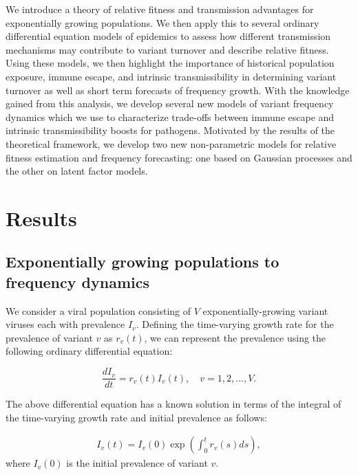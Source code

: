 \documentclass[12pt,oneside,letterpaper]{article}
\begin{document}
We introduce a theory of relative fitness and transmission advantages for exponentially growing populations.
We then apply this to several ordinary differential equation models of epidemics to assess how different transmission mechanisms may contribute to variant turnover and describe relative fitness.
Using these models, we then highlight the importance of historical population exposure, immune escape, and intrinsic transmissibility in determining variant turnover as well as short term forecasts of frequency growth.
With the knowledge gained from this analysis, we develop several new models of variant frequency dynamics which we use to characterize trade-offs between immune escape and intrinsic transmissibility boosts for pathogens.
Motivated by the results of the theoretical framework, we develop two new non-parametric models for relative fitness estimation and frequency forecasting: one based on Gaussian processes and the other on latent factor models.

\section*{Results}

\subsection*{Exponentially growing populations to frequency dynamics}%

We consider a viral population consisting of $V$ exponentially-growing variant viruses each with prevalence $I_{v}$.
Defining the time-varying growth rate for the prevalence of variant $v$ as $r_{v}(t)$, we can represent the prevalence using the following ordinary differential equation:

\begin{equation} \label{eq:inhomo_exp_growth}
    \frac{d I_{v}}{d t} = r_{v}(t) I_{v}(t), \quad v = 1,2, \ldots, V.
\end{equation}

The above differential equation has a known solution in terms of the integral of the time-varying growth rate and initial prevalence as follows:

\begin{align*}
I_{v}(t) = I_{v}(0) \exp\left( \int_{0}^{t} r_{v}(s) ds\right),
\end{align*}
where $I_{v}(0)$ is the initial prevalence of variant $v$. 
\end{document}
